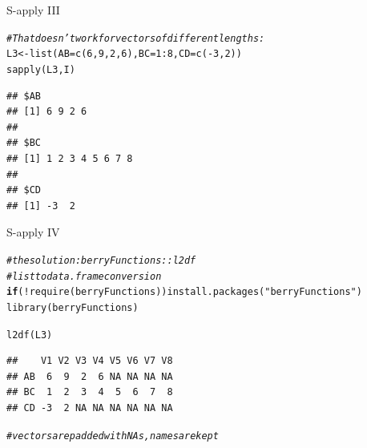 \documentclass[xcolor=table,           xcolor=dvipsnames]{beamer}\usepackage[]{graphicx}\usepackage[]{color}
\makeatletter
\newcommand{\hlnum}[1]{\textcolor[rgb]{0,0,0}{#1}}
\newcommand{\hlstr}[1]{\textcolor[rgb]{0.545,0.137,0.137}{#1}}
\newcommand{\hlcom}[1]{\textcolor[rgb]{0,0.392,0}{\textit{#1}}}
\newcommand{\hlopt}[1]{\textcolor[rgb]{0,0,0}{#1}}
\newcommand{\hlstd}[1]{\textcolor[rgb]{0,0,0}{#1}}
\newcommand{\hlkwa}[1]{\textcolor[rgb]{1,0,0}{\textbf{#1}}}
\newcommand{\hlkwb}[1]{\textcolor[rgb]{0,0,0}{#1}}
\newcommand{\hlkwc}[1]{\textcolor[rgb]{1,0,1}{#1}}
\newcommand{\hlkwd}[1]{\textcolor[rgb]{0,0,1}{#1}}
\newenvironment{kframe}{%
 \def\at@end@of@kframe{}%
 \ifinner\ifhmode%
  \def\at@end@of@kframe{\end{minipage}}%
  \begin{minipage}{\columnwidth}%
 \fi\fi%
 \def\FrameCommand##1{\hskip\@totalleftmargin \hskip-\fboxsep
 \colorbox{shadecolor}{##1}\hskip-\fboxsep
     \hskip-\linewidth \hskip-\@totalleftmargin \hskip\columnwidth}%
 \MakeFramed {\advance\hsize-\width
   \@totalleftmargin\z@ \linewidth\hsize
   \@setminipage}}%
 {\par\unskip\endMakeFramed%
 \at@end@of@kframe}
\newenvironment{knitrout}{}{} %
\makeatother
\begin{document}
\begin{frame}[fragile]{S-apply III}
\begin{knitrout}
\color{fgcolor}\begin{kframe}
\begin{alltt}
\hlcom{# That doesn't work for vectors of different lengths:}
\hlstd{L3} \hlkwb{<-} \hlkwd{list}\hlstd{(}\hlkwc{AB}\hlstd{=}\hlkwd{c}\hlstd{(}\hlnum{6}\hlstd{,}\hlnum{9}\hlstd{,}\hlnum{2}\hlstd{,}\hlnum{6}\hlstd{),} \hlkwc{BC}\hlstd{=}\hlnum{1}\hlopt{:}\hlnum{8}\hlstd{,} \hlkwc{CD}\hlstd{=}\hlkwd{c}\hlstd{(}\hlopt{-}\hlnum{3}\hlstd{,}\hlnum{2}\hlstd{) )}
\hlkwd{sapply}\hlstd{(L3, I)}
\end{alltt}
\begin{verbatim}
## $AB
## [1] 6 9 2 6
## 
## $BC
## [1] 1 2 3 4 5 6 7 8
## 
## $CD
## [1] -3  2
\end{verbatim}
\end{kframe}
\end{knitrout}
\end{frame}


\begin{frame}[fragile]{S-apply IV}
\begin{knitrout}\small
{}\color{fgcolor}\begin{kframe}
\begin{alltt}
\hlcom{# the solution: berryFunctions::l2df}
\hlcom{# list to data.frame conversion}
\hlkwa{if}\hlstd{(}\hlopt{!}\hlkwd{require}\hlstd{(berryFunctions))} \hlkwd{install.packages}\hlstd{(}\hlstr{"berryFunctions"}\hlstd{)}
\hlkwd{library}\hlstd{(berryFunctions)}

\hlkwd{l2df}\hlstd{(L3)}
\end{alltt}
\begin{verbatim}
##    V1 V2 V3 V4 V5 V6 V7 V8
## AB  6  9  2  6 NA NA NA NA
## BC  1  2  3  4  5  6  7  8
## CD -3  2 NA NA NA NA NA NA
\end{verbatim}
\begin{alltt}
\hlcom{# vectors are padded with NAs, names are kept}
\end{alltt}
\end{kframe}
\end{knitrout}

\end{frame}

\end{document}
